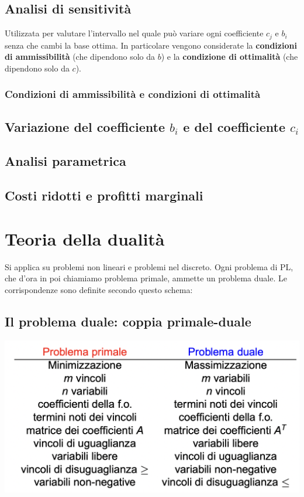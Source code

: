 \documentclass[11pt, oneside]{article}   	%
\begin{document}
\subsection{Analisi di sensitività}
Utilizzata per valutare l'intervallo nel quale può variare ogni coefficiente $c_j$ e $b_i$ senza che cambi la base ottima. In particolare vengono considerate la \textbf{condizioni di ammissibilità} (che dipendono solo da $b$) e la \textbf{condizione di ottimalità} (che dipendono solo da $c$).
\subsubsection{Condizioni di ammissibilità e condizioni di ottimalità}
\subsection{Variazione del coefficiente $b_i$ e del coefficiente $c_i$}
\subsection{Analisi parametrica}
\subsection{Costi ridotti e profitti marginali}


\section{Teoria della dualità}
Si applica su problemi non lineari e problemi nel discreto. Ogni problema di PL, che d'ora in poi chiamiamo problema primale, ammette un problema duale. Le corrispondenze sono definite secondo questo schema:
\subsection{Il problema duale: coppia primale-duale}
\begin{center}
\includegraphics[scale=0.3]{dualita}
\end{center}
\end{document}
